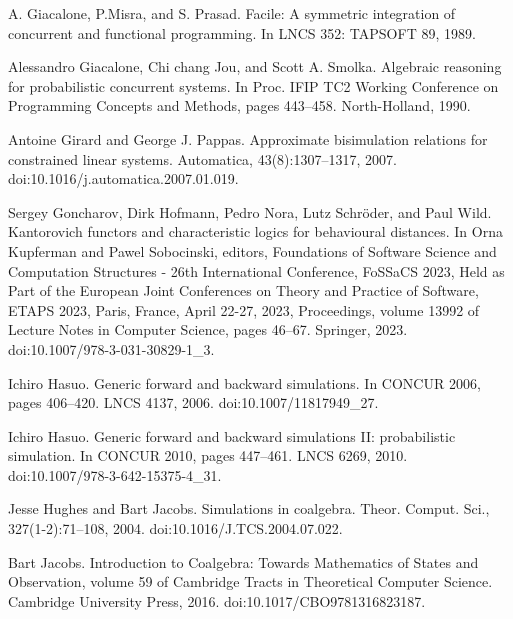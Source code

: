 \documentclass[10pt,a4paper]{article}
\begin{document}
\par\noindent  [28]  A. Giacalone, P.Misra, and S. Prasad.  Facile: A symmetric integration of concurrent and functional programming.  In LNCS 352: TAPSOFT 89, 1989.  
 
\par\noindent  [29]  Alessandro Giacalone, Chi chang Jou, and Scott A. Smolka.  Algebraic reasoning for probabilistic concurrent systems.  In Proc. IFIP TC2 Working Conference on Programming Concepts and Methods, pages 443–458. North-Holland, 1990.  
 
\par\noindent  [30]  Antoine Girard and George J. Pappas.  Approximate bisimulation relations for constrained linear systems.  Automatica, 43(8):1307–1317, 2007.  doi:10.1016/j.automatica.2007.01.019.  
 
\par\noindent  [31]  Sergey Goncharov, Dirk Hofmann, Pedro Nora, Lutz Schröder, and Paul Wild.  Kantorovich functors and characteristic logics for behavioural distances.  In Orna Kupferman and Pawel Sobocinski, editors, Foundations of Software Science and Computation Structures - 26th International Conference, FoSSaCS 2023, Held as Part of the European Joint Conferences on Theory and Practice of Software, ETAPS 2023, Paris, France, April 22-27, 2023, Proceedings, volume 13992 of Lecture Notes in Computer Science, pages 46–67. Springer, 2023.  doi:10.1007/978-3-031-30829-1\_3.  
 
\par\noindent  [32]  Ichiro Hasuo.  Generic forward and backward simulations.  In CONCUR 2006, pages 406–420. LNCS 4137, 2006.  doi:10.1007/11817949\_27.  
 
\par\noindent  [33]  Ichiro Hasuo.  Generic forward and backward simulations II: probabilistic simulation.  In CONCUR 2010, pages 447–461. LNCS 6269, 2010.  doi:10.1007/978-3-642-15375-4\_31.  
 
\par\noindent  [34]  Jesse Hughes and Bart Jacobs.  Simulations in coalgebra.  Theor. Comput. Sci., 327(1-2):71–108, 2004.  doi:10.1016/J.TCS.2004.07.022.  
 
\par\noindent  [35]  Bart Jacobs.  Introduction to Coalgebra: Towards Mathematics of States and Observation, volume 59 of Cambridge Tracts in Theoretical Computer Science.  Cambridge University Press, 2016.  doi:10.1017/CBO9781316823187.  
 
\end{document}
